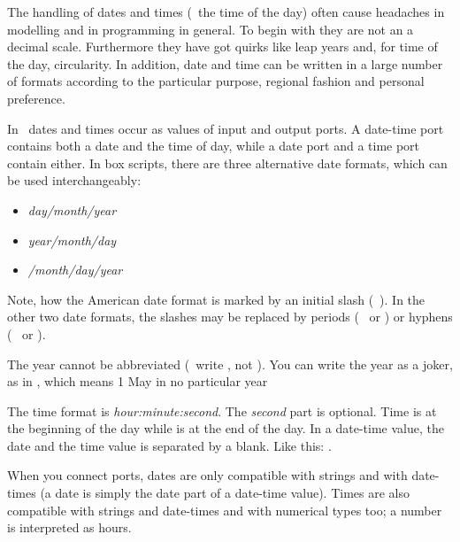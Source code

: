 The handling of dates and times (\ie\ the time of the day) often cause headaches in modelling and in programming in general. To begin with they are not an a decimal scale. Furthermore they have got quirks like leap years and, for time of the day, circularity. In addition, date and time can be written in a large number of formats according to the particular purpose, regional fashion and personal preference.

In \US\ dates and times occur as values of input and output ports. A date-time port contains both a date and the time of day, while a date port and a time port contain either. In box scripts, there are three alternative date formats, which can be used interchangeably:
\begin{itemize}
\item \textit{day/month/year}
\item \textit{year/month/day} 
\item \textit{/month/day/year}
\end{itemize}

Note, how the American date format is marked by an initial slash (\eg\ ). In the other two date formats, the slashes may be replaced by periods (\eg\  or ) or hyphens (\eg\  or ). 

The year cannot be abbreviated (\eg\ write , not ). You can write the year as a joker, as in , which means 1 May in no particular year

The time format is \textit{hour:minute:second}. The \textit{second} part is optional. Time  is at the beginning of the day while  is at the end of the day. In a date-time value, the date and the time value is separated by a blank. Like this: .

When you connect ports, dates are only compatible with strings and with date-times (a date is simply the date part of a date-time value). Times are also compatible with strings and date-times and with numerical types too; a number is interpreted as hours.

